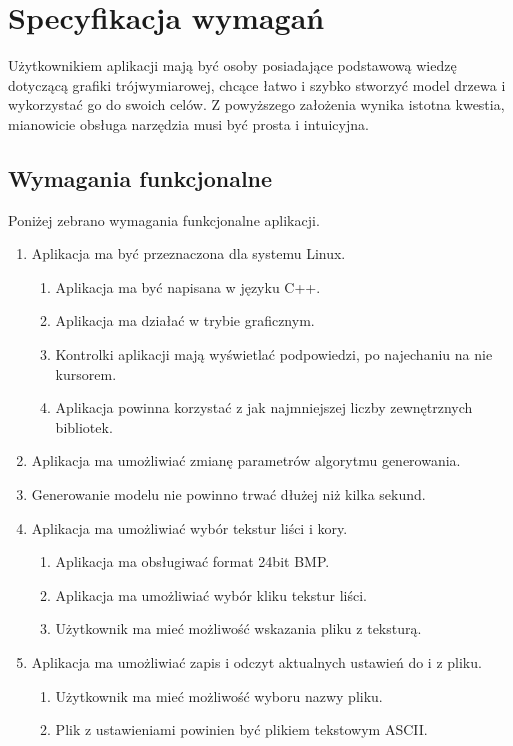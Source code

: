 \chapter{Specyfikacja wymagań}
Użytkownikiem aplikacji mają być osoby posiadające podstawową wiedzę dotyczącą grafiki trójwymiarowej,
chcące łatwo i szybko stworzyć model drzewa i wykorzystać go do swoich celów. Z powyższego założenia
wynika istotna kwestia, mianowicie obsługa narzędzia musi być prosta i intuicyjna. \\

\section{Wymagania funkcjonalne} 
Poniżej zebrano wymagania funkcjonalne aplikacji.
\begin{enumerate}
\item Aplikacja ma być przeznaczona dla systemu Linux. 
\begin{enumerate}
\item Aplikacja ma być napisana w języku C++.
\item Aplikacja ma działać w trybie graficznym.
\item Kontrolki aplikacji mają wyświetlać podpowiedzi, po najechaniu na nie kursorem.
\item Aplikacja powinna korzystać z jak najmniejszej liczby zewnętrznych bibliotek.
\end{enumerate}
\item Aplikacja ma umożliwiać zmianę parametrów algorytmu generowania.
\item Generowanie modelu nie powinno trwać dłużej niż kilka sekund.
\item Aplikacja ma umożliwiać wybór tekstur liści i kory.
\begin{enumerate}
\item Aplikacja ma obsługiwać format 24bit BMP. 
\item Aplikacja ma umożliwiać wybór kliku tekstur liści.
\item Użytkownik ma mieć możliwość wskazania pliku z teksturą.
\end{enumerate}
\item  Aplikacja ma umożliwiać zapis i odczyt aktualnych ustawień do i z pliku.
\begin{enumerate}
\item Użytkownik ma mieć możliwość wyboru nazwy pliku.
\item Plik z ustawieniami powinien być plikiem tekstowym ASCII.
\end{enumerate}

\end{enumerate}
